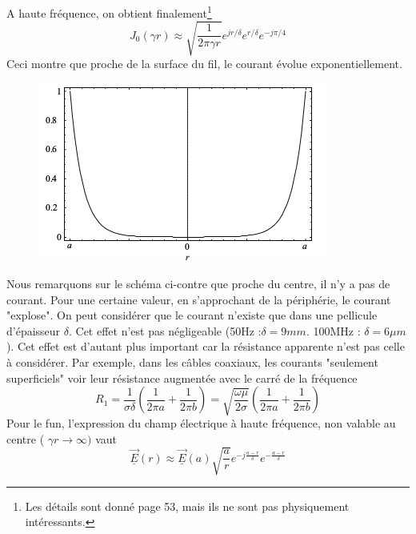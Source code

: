 A  haute fréquence, on obtient finalement\footnote{Les détails sont donné page 53, mais ils 
ne sont pas physiquement intéressants.} 
\begin{equation}
J_0(\gamma r) \approx \sqrt{\dfrac{1}{2\pi\gamma r}}e^{jr/\delta}e^{r/\delta}e^{-j\pi/4}
\end{equation}
Ceci montre que proche de la surface du fil, le courant évolue exponentiellement.

\newpage
	\begin{figure}
	\includegraphics[scale=0.45]{ch3/image2.png}
	\end{figure}
Nous remarquons sur le schéma ci-contre que proche du centre, il n'y a pas de courant. Pour une 
certaine valeur, en s'approchant de la périphérie, le courant "explose". On peut considérer 
que le courant n'existe que dans une pellicule d'épaisseur $\delta$. Cet effet n'est pas 
négligeable (50Hz :$\delta = 9mm$. 100MHz : $\delta = 6\mu m$). Cet effet est d'autant plus 
important car la résistance apparente n'est pas celle à considérer. Par exemple, dans les 
câbles coaxiaux, les courants "seulement superficiels" voir leur résistance augmentée avec le 
carré de la fréquence
\begin{equation}
R_1 = \dfrac{1}{\sigma\delta}\left(\dfrac{1}{2\pi a}+\dfrac{1}{2\pi b}\right)=
\sqrt{\dfrac{\omega\mu}{2\sigma}}\left(\dfrac{1}{2\pi a}+\dfrac{1}{2\pi b}\right)
\end{equation}
Pour le fun, l'expression du champ électrique à haute fréquence, non valable au centre (
$\gamma r \rightarrow \infty)$ vaut 
\begin{equation}
\underline{\vec{E}}(r) \approx \vec{\underline{E}}(a)\sqrt{\dfrac{a}{r}}e^{-j\frac{a-r}{\delta}}
e^{-\frac{a-r}{\delta}}
\end{equation}
	
	
	
	
	
	
	
	
	
	
	
	
	
	
	
	
	
